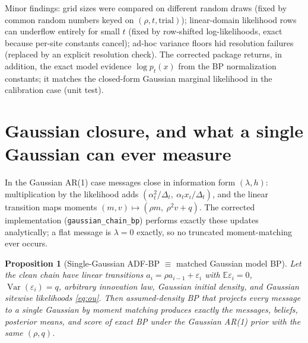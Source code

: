\documentclass[11pt]{article}
\newtheorem{proposition}{Proposition}
\newcommand{\E}{\mathbb{E}}
\newcommand{\Var}{\operatorname{Var}}
\begin{document}
Minor findings: grid sizes were compared on different random draws (fixed by common
random numbers keyed on $(\rho,t,\mathrm{trial})$); linear-domain likelihood rows can
underflow entirely for small $t$ (fixed by row-shifted log-likelihoods, exact because
per-site constants cancel); ad-hoc variance floors hid resolution failures (replaced by
an explicit resolution check). The corrected package returns, in addition, the exact
model evidence $\log p_t(x)$ from the BP normalization constants; it matches the
closed-form Gaussian marginal likelihood in the calibration case (unit test).

\section{Gaussian closure, and what a single Gaussian can ever measure}

In the Gaussian AR(1) case messages close in information form
$(\lambda, h)$: multiplication by the likelihood adds
$(\alpha_t^2/\Delta_t,\ \alpha_t x_i/\Delta_t)$, and the linear transition maps moments
$(m,v)\mapsto(\rho m,\ \rho^2 v + q)$. The corrected implementation
(\texttt{gaussian\_chain\_bp}) performs exactly these updates analytically; a flat
message is $\lambda=0$ exactly, so no truncated moment-matching ever occurs.

\begin{proposition}[Single-Gaussian ADF-BP $\equiv$ matched Gaussian model BP]
\label{prop:equivalence}
Let the clean chain have \emph{linear} transitions $a_i=\rho a_{i-1}+\varepsilon_i$
with $\E\varepsilon_i=0$, $\Var(\varepsilon_i)=q$, arbitrary innovation law, Gaussian
initial density, and Gaussian sitewise likelihoods \eqref{eq:ou}. Then assumed-density
BP that projects every message to a single Gaussian by moment matching produces
exactly the messages, beliefs, posterior means, and score of \emph{exact} BP under the
Gaussian AR(1) prior with the same $(\rho,q)$.
\end{proposition}
\end{document}
